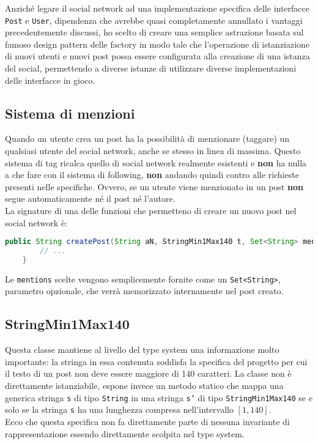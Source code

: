 \documentclass[a4paper,10pt]{article}
\begin{document}
Anziché legare il social network ad una implementazione specifica delle interfacce \texttt{Post} e \texttt{User}, dipendenza che avrebbe quasi completamente annullato
i vantaggi precedentemente discussi, ho scelto di creare una semplice astrazione basata sul famoso design pattern delle factory in modo tale che l'operazione di istanziazione di
nuovi utenti e nuovi post possa essere configurata alla creazione di una istanza del social, permettendo a diverse istanze di utilizzare diverse implementazioni delle interfacce in gioco.


\subsection*{Sistema di menzioni}

Quando un utente crea un post ha la possibilità di menzionare (taggare) un qualsiasi utente del social network, anche se stesso in linea di massima.
Questo sistema di tag ricalca quello di social network realmente esistenti e \textbf{non} ha nulla a che fare con il sistema di following, \textbf{non}
andando quindi contro alle richieste presenti nelle specifiche. Ovvero, se un utente viene menzionato in un post \textbf{non} segue automaticamente né il post né l'autore.\\
La signature di una delle funzioni che permetteno di creare un nuovo post nel social network è:

\begin{lstlisting}[language=java]
    public String createPost(String aN, StringMin1Max140 t, Set<String> mentions) {
        // ...
    }
\end{lstlisting}

\noindent
Le \texttt{mentions} scelte vengono semplicemente fornite come un \texttt{Set<String>}, parametro opzionale, che verrà memorizzato internamente nel post creato.

\subsection*{StringMin1Max140}
Questa classe mantiene al livello del type system una informazione molto importante: la stringa in essa contenuta soddisfa la specifica del progetto per cui il
testo di un post non deve essere maggiore di 140 caratteri. La classe non è direttamente istanziabile, espone invece un metodo statico che mappa una generica stringa \texttt{s} di tipo
\texttt{String} in una stringa \texttt{s'} di tipo \texttt{StringMin1Max140} se e solo se la stringa \texttt{s} ha una lunghezza compresa nell'intervallo $[1, 140]$.\\
Ecco che questa specifica non fa direttamente parte di nessuna invariante di rappresentazione essendo direttamente scolpita nel type system.
\end{document}
